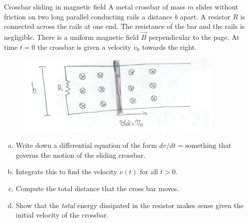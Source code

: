 \documentclass[makesolutionspdf]{esg8022pset}
\begin{document}
\begin{solution}
\begin{center}
  \end{center}
\end{solution}

\begin{problem}{Crossbar sliding in magnetic field}
  A metal crossbar of mass $m$ slides without friction on two long parallel
  conducting rails a distance $b$ apart.  A resistor $R$ is connected across
  the rails at one end. The resistance of the bar and the rails is negligible.
  There is a uniform magnetic field $\vec{B}$ perpendicular to the page. At
  time $t=0$ the crossbar is given a velocity $v_0$ towards the right.

  \begin{figure}[H]
    \centering
    \includegraphics[width = 10cm]{crossbar}
    \label{fig:crossbar}
  \end{figure}
  
  \begin{enumerate}[(a)]
    \item Write down a differential equation of the form $dv/dt =
      \text{something}$ that governs the motion of the sliding crossbar.
    \item Integrate this to find the velocity $v(t)$ for all $t > 0$.
    \item Compute the total distance that the cross bar moves.
    \item Show that the \emph{total} energy dissipated in the resistor makes
      sense given the initial velocity of the crossbar.
  \end{enumerate}
\end{problem}
\end{document}
